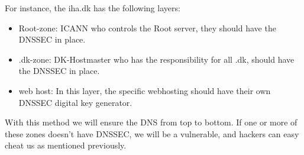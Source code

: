 For instance, the iha.dk has the following layers:

\begin{itemize}
\item Root-zone: ICANN who controls the Root server, they should have the DNSSEC in place. 
\item .dk-zone: DK-Hostmaster who has the responsibility for all .dk, should have the DNSSEC in place.
\item web host: In this layer, the specific webhosting should have their own DNSSEC digital key generator.
\end{itemize}

With this method we will ensure the DNS from top to bottom.
If one or more of these zones doesn't have DNSSEC, we will be a vulnerable, and hackers can easy cheat us as mentioned previously. 